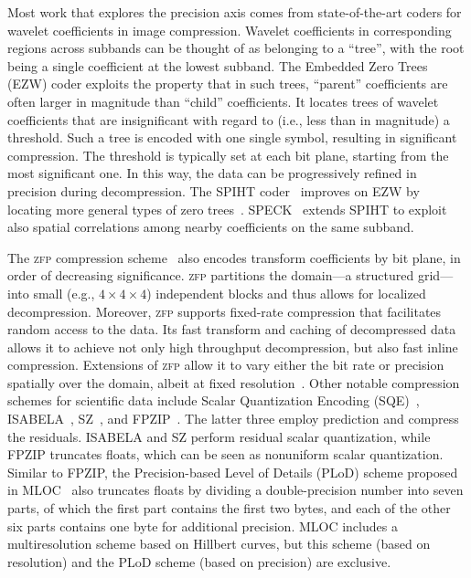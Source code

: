Most work that explores the precision axis comes from state-of-the-art coders for wavelet
coefficients in image compression. Wavelet coefficients in corresponding regions across subbands can
be thought of as belonging to a ``tree'', with the root being a single coefficient at the lowest
subband. The Embedded Zero Trees (EZW) coder exploits the property that in such trees, ``parent''
coefficients are often larger in magnitude than ``child'' coefficients. It locates trees of wavelet
coefficients that are insignificant with regard to (i.e., less than in magnitude) a threshold. Such
a tree is encoded with one single symbol, resulting in significant compression. The threshold is
typically set at each bit plane, starting from the most significant one. In this way, the data can
be progressively refined in precision during decompression. The SPIHT coder~\cite{spiht1996}
improves on EZW by locating more general types of zero trees~\cite{quantifying-coding-performance}.
SPECK~\cite{speck2004} extends SPIHT to exploit also spatial correlations among nearby coefficients
on the same subband.

\newcommand{\zfp}{\textsc{zfp}\xspace}
The \zfp compression scheme~\cite{zfp2014} also encodes transform coefficients by bit plane, in
order of decreasing significance. \zfp partitions the domain---a structured grid---into small (e.g.,
$4 \times 4 \times 4$) independent blocks and thus allows for localized decompression. Moreover,
\zfp supports fixed-rate compression that facilitates random access to the data. Its fast transform
and caching of decompressed data allows it to achieve not only high throughput decompression, but
also fast inline compression. Extensions of \zfp allow it to vary either the bit rate or precision
spatially over the domain, albeit at fixed resolution~\cite{zfp-arc}. Other notable compression
schemes for scientific data include Scalar Quantization Encoding (SQE)~\cite{sqe},
ISABELA~\cite{isabela}, SZ~\cite{sz}, and FPZIP~\cite{fpzip}. The latter three employ prediction and
compress the residuals. ISABELA and SZ perform residual scalar quantization, while FPZIP truncates
floats, which can be seen as nonuniform scalar quantization. Similar to FPZIP, the Precision-based
Level of Details (PLoD) scheme proposed in MLOC~\cite{mloc} also truncates floats by dividing a
double-precision number into seven parts, of which the first part contains the first two bytes, and
each of the other six parts contains one byte for additional precision. MLOC includes a
multiresolution scheme based on Hillbert curves, but this scheme (based on resolution) and the PLoD
scheme (based on precision) are exclusive.

